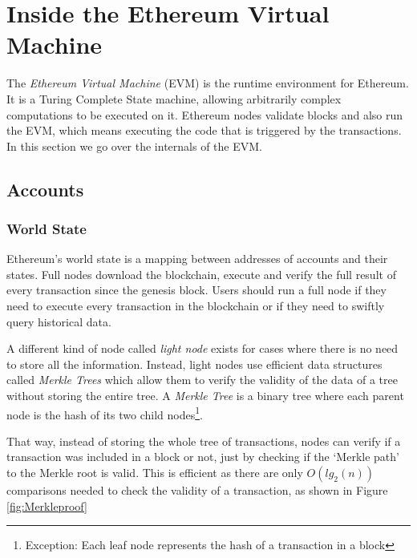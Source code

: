 

\section{Inside the Ethereum Virtual Machine}
\label{ch:basics:insideevm}
The \textit{Ethereum Virtual Machine} (EVM) is the runtime environment for Ethereum. It is a Turing Complete State machine, allowing arbitrarily complex computations to be executed on it. Ethereum nodes validate blocks and also run the EVM, which means executing the code that is triggered by the transactions. In this section we go over the internals of the EVM\@. 

\subsection{Accounts}

\subsubsection*{World State}
Ethereum's world state is a mapping between addresses of accounts and their states. Full nodes download the blockchain, execute and verify the full result of every transaction since the genesis block. Users should run a full node if they need to execute every transaction in the blockchain or if they need to swiftly query historical data. 



A different kind of node called \textit{light node} exists for cases where there is no need to store all the information. Instead, light nodes use efficient data structures called \textit{Merkle Trees} which allow them to verify the validity of the data of a tree without storing the entire tree. A \textit{Merkle Tree} is a binary tree where each parent node is the hash of its two child nodes\footnote{Exception: Each leaf node represents the hash of a transaction in a block}. 



That way, instead of storing the whole tree of transactions, nodes can verify if a transaction was included in a block or not, just by checking if the `Merkle path' to the Merkle root is valid. This is efficient as there are only $O(lg_{2}(n))$ comparisons needed to check the validity of a transaction, as shown in Figure \ref{fig:Merkleproof}

